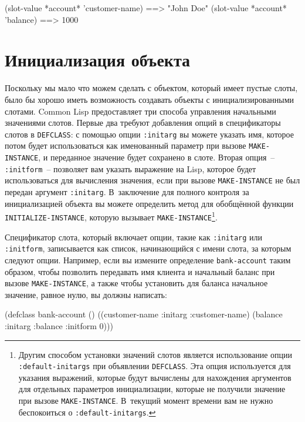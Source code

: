 \begin{myverb}
(slot-value *account* 'customer-name) ==> "John Doe"
(slot-value *account* 'balance)       ==> 1000
\end{myverb}

\section{Инициализация объекта}

Поскольку мы мало что можем сделать с объектом, который имеет пустые слоты, было бы хорошо
иметь возможность создавать объекты с инициализированными слотами.  Common Lisp
предоставляет три способа управления начальными значениями слотов.  Первые два требуют
добавления опций в спецификаторы слотов в \lstinline{DEFCLASS}: с помощью опции
\lstinline{:initarg} вы можете указать имя, которое потом будет использоваться как
именованный параметр при вызове \lstinline{MAKE-INSTANCE}, и переданное значение будет
сохранено в слоте.  Вторая опция~-- \lstinline{:initform}~-- позволяет вам указать выражение
на Lisp, которое будет использоваться для вычисления значения, если при вызове
\lstinline{MAKE-INSTANCE} не был передан аргумент \lstinline{:initarg}.  В~заключение
для полного контроля за инициализацией объекта вы можете определить метод для обобщённой
функции \lstinline{INITIALIZE-INSTANCE}, которую вызывает
\lstinline{MAKE-INSTANCE}\footnote{Другим способом установки значений слотов является
  использование опции \lstinline{:default-initargs} при объявлении \lstinline{DEFCLASS}.
  Эта опция используется для указания выражений, которые будут вычислены для нахождения
  аргументов для отдельных параметров инициализации, которые не получили значение при
  вызове \lstinline{MAKE-INSTANCE}.  В~текущий момент времени вам не нужно беспокоиться о
  \lstinline{:default-initargs}.}.

Спецификатор слота, который включает опции, такие как \lstinline{:initarg} или
\lstinline{:initform}, записывается как список, начинающийся с имени слота, за которым следуют
опции.  Например, если вы измените определение \lstinline{bank-account} таким образом, чтобы
позволить передавать имя клиента и начальный баланс при вызове \lstinline{MAKE-INSTANCE}, а
также чтобы установить для баланса начальное значение, равное нулю, вы должны написать:

\begin{myverb}
(defclass bank-account ()
  ((customer-name
    :initarg :customer-name)
   (balance
    :initarg :balance
    :initform 0)))
\end{myverb}

